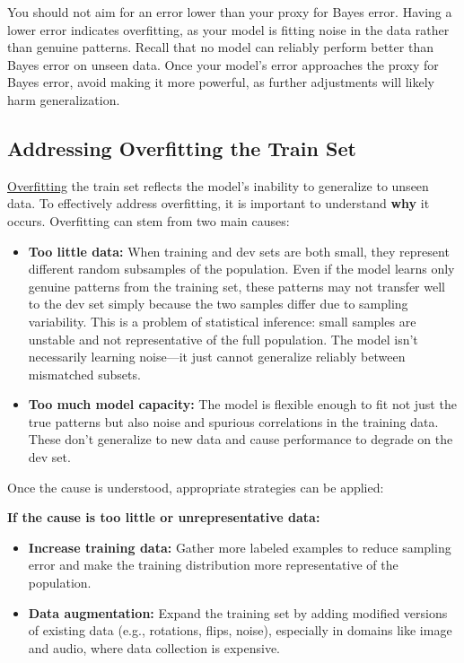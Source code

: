 \documentclass[12pt,openany]{book}
\begin{document}
\begin{notebox}
You should not aim for an error lower than your proxy for Bayes error. Having a lower error indicates overfitting, as your model is fitting noise in the data rather than genuine patterns. Recall that no model can reliably perform better than Bayes error on unseen data. Once your model’s error approaches the proxy for Bayes error, avoid making it more powerful, as further adjustments will likely harm generalization.
\end{notebox}


\subsection{Addressing Overfitting the Train Set} \label{sec:addressing_variance}

\hyperref[subsec:overfitting]{Overfitting} the train set reflects the model’s inability to generalize to unseen data. To effectively address overfitting, it is important to understand \textbf{why} it occurs. Overfitting can stem from two main causes:

\begin{itemize}
    \item \textbf{Too little data:} When training and dev sets are both small, they represent different random subsamples of the population. Even if the model learns only genuine patterns from the training set, these patterns may not transfer well to the dev set simply because the two samples differ due to sampling variability. This is a problem of statistical inference: small samples are unstable and not representative of the full population. The model isn't necessarily learning noise—it just cannot generalize reliably between mismatched subsets.
    
    \item \textbf{Too much model capacity:} The model is flexible enough to fit not just the true patterns but also noise and spurious correlations in the training data. These don’t generalize to new data and cause performance to degrade on the dev set.
\end{itemize}

Once the cause is understood, appropriate strategies can be applied:

\textbf{If the cause is too little or unrepresentative data:}
\begin{itemize}
    \item \textbf{Increase training data:} Gather more labeled examples to reduce sampling error and make the training distribution more representative of the population.
    \item \textbf{Data augmentation:} Expand the training set by adding modified versions of existing data (e.g., rotations, flips, noise), especially in domains like image and audio, where data collection is expensive.
\end{itemize}
\end{document}
